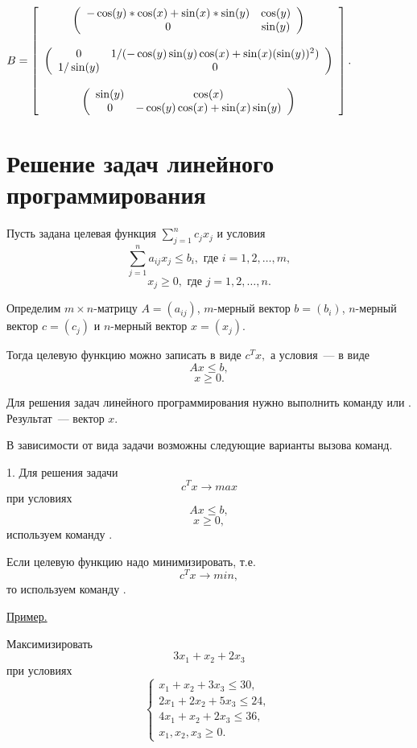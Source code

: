 {$B = \left[\begin{array}{c}
\mtr{-\cos(y)*\cos(x)+\sin(x)*\sin(y)}{\cos(y)}{0}{\sin(y)}\\
\null \\
\mtr{0}{1/(-\cos(y)\sin(y)\cos(x)+\sin(x)(\sin(y))^2)}{1/\sin(y)}{0}\\
\null \\
\mtr{\sin(y)}{\cos(x)}{0}{-\cos(y)\cos(x)+\sin(x)\sin(y)}\\
 \end{array}\right].$
} 

\section{Решение задач линейного программирования}
Пусть задана целевая функция $\sum_{j = 1}^n c_j x_j$
и условия
$$\sum_{j = 1}^n a_{ij}x_j\leqslant b_i,\text{ где }i = 1,2,\ldots,m,$$
$$x_j\geqslant 0,\text{ где }j = 1,2,\ldots,n.$$

Определим $m\times n$-матрицу $A = (a_{ij})$,
$m$-мерный вектор $b = (b_i)$, $n$-мерный вектор $c = (c_j)$ и $n$-мерный вектор $x = (x_j)$.

Тогда целевую функцию можно записать в виде 
$c^Tx,$
а условия~--- в виде 
$$Ax \leqslant b,$$
$$ x \geqslant 0.$$

Для решения задач линейного программирования нужно выполнить команду 
  или  . Результат~--- вектор $x$.

В зависимости от вида задачи возможны следующие варианты вызова команд.

1. Для решения задачи
$$c^Tx \rightarrow max$$
при условиях
$$Ax \leqslant b,$$
$$ x \geqslant 0,$$
используем команду .

Если целевую функцию надо минимизировать, т.е. $$c^Tx \rightarrow min,$$ то используем команду .

\underline{%
Пример.%
}

Максимизировать $$3x_1 + x_2 + 2x_3$$
при условиях
$$%
  \left\{
  \begin{array}{c}%
   x_1 +  x_2 + 3x_3 \leqslant 30,\ \\
  2x_1 + 2x_2 + 5x_3 \leqslant 24,\ \\
  4x_1 +  x_2 + 2x_3 \leqslant 36,\ \\
   x_1,   x_2,   x_3 \geqslant 0.%
  \end{array}
  \right.%
$$

